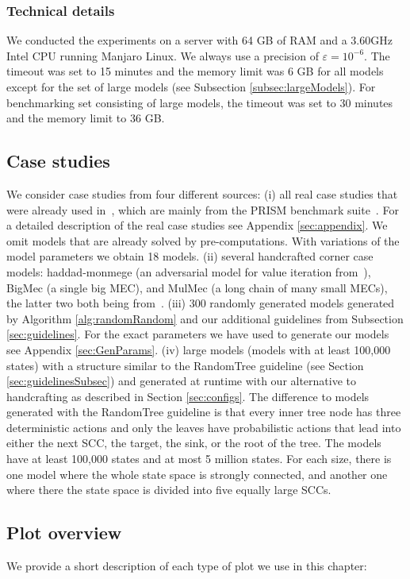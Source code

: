 \subsubsection*{Technical details}
We conducted the experiments on a server with 64 GB of RAM and a 3.60GHz Intel CPU running Manjaro Linux. %
We always use a precision of $\varepsilon=10^{-6}$. 
The timeout was set to 15 minutes and the memory limit was 6 GB for all models except for the set of large models (see Subsection \ref{subsec:largeModels}).
For benchmarking set consisting of large models, the timeout was set to 30 minutes and the memory limit to 36 GB.

\subsection{Case studies} \label{subsec:casestudies}
We consider case studies from four different sources: 
(i) all real case studies that were already used in~\cite{gandalf}, which are mainly from the PRISM benchmark suite~\cite{PRISMben}.
For a detailed description of the real case studies see Appendix \ref{sec:appendix}.
We omit models that are already solved by pre-computations.
With variations of the model parameters we obtain 18 models.
(ii) several handcrafted corner case models: haddad-monmege (an adversarial model for value iteration from~\cite{haddadmonmege}), BigMec (a single big MEC), and MulMec (a long chain of many small MECs), the latter two both being from~\cite{gandalf}.
(iii) 300 randomly generated models generated by Algorithm \ref{alg:randomRandom} and our additional guidelines from Subsection \ref{sec:guidelines}.
For the exact parameters we have used to generate our models see Appendix \ref{sec:GenParams}.
(iv) large models (models with at least 100,000 states) with a structure similar to the RandomTree guideline (see Section \ref{sec:guidelinesSubsec}) and generated at runtime with our alternative to handcrafting as described in Section \ref{sec:configs}.
The difference to models generated with the RandomTree guideline is that every inner tree node has three deterministic actions and only the leaves have probabilistic actions that lead into either the next SCC, the target, the sink, or the root of the tree.
The models have at least 100,000 states and at most 5 million states. For each size, there is one model where the whole state space is strongly connected, and another one where there the state space is divided into five equally large SCCs.

\subsection{Plot overview} \label{subsec:plots}
We provide a short description of each type of plot we use in this chapter:
